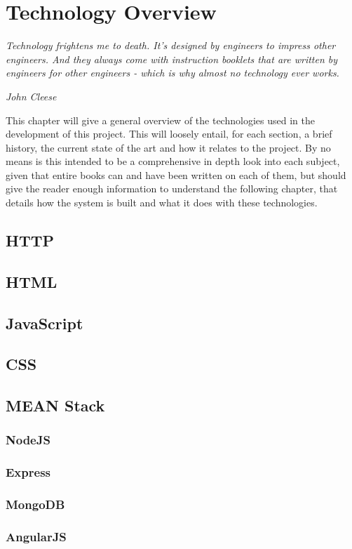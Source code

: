 \chapter{Technology Overview}
\epigraph{\textit{Technology frightens me to death. It’s designed by engineers to impress other engineers.
And they always come with instruction booklets that are written by engineers for other engineers - which is 
why almost no technology ever works.}}{\textit{John Cleese}}
This chapter will give a general overview of the technologies used in the development of this project. 
This will loosely entail, for each section, a brief history, the current state of the art and how it relates 
to the project. By no means is this intended to be a comprehensive in depth look into each subject, given that 
entire books can and have been written on each of them, but should give the reader enough information to understand 
the following chapter, that details how the system is built and what it does with these technologies.
\section{HTTP}
\lipsum
\section{HTML}
\section{JavaScript}
\section{CSS}
\section{MEAN Stack}
\subsection{NodeJS}
\subsection{Express}
\subsection{MongoDB}
\subsection{AngularJS}
